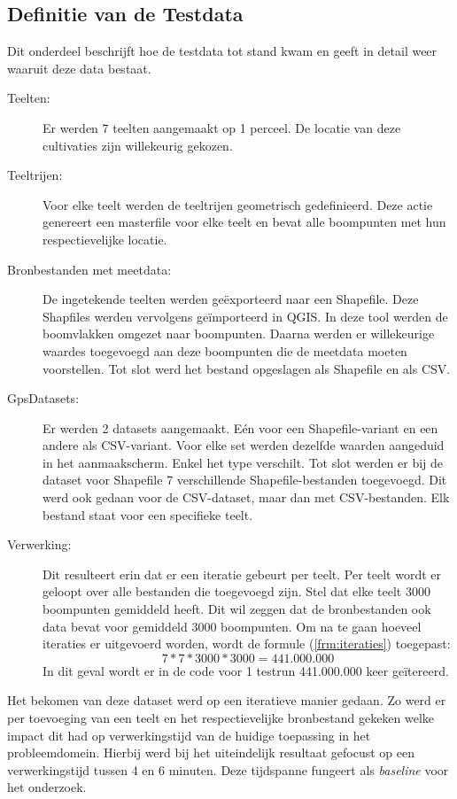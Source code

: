 \subsection{Definitie van de Testdata}

Dit onderdeel beschrijft hoe de testdata tot stand kwam en geeft in detail weer waaruit deze data bestaat. 

\begin{description}
    \item[Teelten:] 
    Er werden 7 teelten aangemaakt op 1 perceel. De locatie van deze cultivaties zijn willekeurig gekozen. 
    \item[Teeltrijen:] 
    Voor elke teelt werden de teeltrijen geometrisch gedefinieerd. Deze actie genereert een masterfile voor elke teelt en bevat alle boompunten met hun respectievelijke locatie.
    \item[Bronbestanden met meetdata:] 
    De ingetekende teelten werden geëxporteerd naar een Shapefile. Deze Shapfiles werden vervolgens geïmporteerd in QGIS. In deze tool werden de boomvlakken omgezet naar boompunten. Daarna werden er willekeurige waardes toegevoegd aan deze boompunten die de meetdata moeten voorstellen. Tot slot werd het bestand opgeslagen als Shapefile en als CSV.
    \item[GpsDatasets:] 
    Er werden 2 datasets aangemaakt. Eén voor een Shapefile-variant en een andere als CSV-variant. Voor elke set werden dezelfde waarden aangeduid in het aanmaakscherm. Enkel het type verschilt. Tot slot werden er bij de dataset voor Shapefile 7 verschillende Shapefile-bestanden toegevoegd. Dit werd ook gedaan voor de CSV-dataset, maar dan met CSV-bestanden. Elk bestand staat voor een specifieke teelt.
    \item[Verwerking:] 
    Dit resulteert erin dat er een iteratie gebeurt per teelt. Per teelt wordt er geloopt over alle bestanden die toegevoegd zijn. Stel dat elke teelt 3000 boompunten gemiddeld heeft. Dit wil zeggen dat de bronbestanden ook data bevat voor gemiddeld 3000 boompunten. Om na te gaan hoeveel iteraties er uitgevoerd worden, wordt de formule (\ref{frm:iteraties}) toegepast:
    \begin{equation}
        7 * 7 * 3000 * 3000 = 441.000.000
    \end{equation}
    In dit geval wordt er in de code voor 1 testrun 441.000.000 keer geïtereerd.
\end{description}

Het bekomen van deze dataset werd op een iteratieve manier gedaan. Zo werd er per toevoeging van een teelt en het respectievelijke bronbestand gekeken welke impact dit had op verwerkingstijd van de huidige toepassing in het probleemdomein. Hierbij werd bij het uiteindelijk resultaat gefocust op een verwerkingstijd tussen 4 en 6 minuten. Deze tijdspanne fungeert als \textit{baseline} voor het onderzoek.

